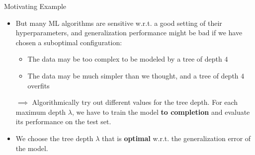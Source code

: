 \documentclass[11pt,compress,t,notes=noshow, xcolor=table]{beamer}
\begin{document}
\begin{vbframe}{Motivating Example}
\framebreak 

\begin{itemize}
\item But many ML algorithms are sensitive w.r.t. a good setting of their hyperparameters,
  and generalization performance might be bad if we have chosen a suboptimal configuration:
\begin{itemize}
\item The data may be too complex to be modeled by a tree of depth $4$ 
\item The data may be much simpler than we thought, and a tree of depth $4$ overfits
\end{itemize}
\item[$\implies$] Algorithmically try out different values for the tree depth. For each maximum depth $\lambda$, we have to train the model \textbf{to completion} and evaluate its performance on the test set. 
\item We choose the tree depth $\lambda$ that is \textbf{optimal} w.r.t. the generalization error of the model. 
\end{itemize}


\end{vbframe}



\end{document}
